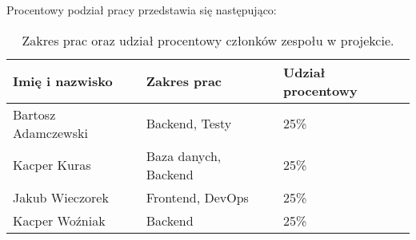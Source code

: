 Procentowy podział pracy przedstawia się następująco:

\begin{table}[h!]
    \centering
    \begin{tabular}{|l|l|l|}
        \hline
        \textbf{Imię i nazwisko} & \textbf{Zakres prac} & \textbf{Udział procentowy}\\
        \hline
        Bartosz Adamczewski & Backend, Testy & 25\%\\
        Kacper Kuras & Baza danych, Backend & 25\%\\
        Jakub Wieczorek & Frontend, DevOps & 25\%\\
        Kacper Woźniak & Backend & 25\%\\
        \hline
    \end{tabular}
    \caption{Zakres prac oraz udział procentowy członków zespołu w projekcie.}
    \label{tab:udzial_zespolu}
\end{table}
